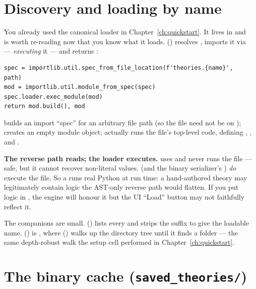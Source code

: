 \section{Discovery and loading by name}

You already used the canonical loader in Chapter~\ref{ch:quickstart}. It lives in
 and is worth re-reading now that you know what it
loads.  ()
resolves , imports it via 
--- \emph{executing} it --- and returns :

\begin{lstlisting}
spec = importlib.util.spec_from_file_location(f'theories.{name}', path)
mod = importlib.util.module_from_spec(spec)
spec.loader.exec_module(mod)
return mod.build(), mod
\end{lstlisting}

 builds an import ``spec'' for an arbitrary file
path (so the file need not be on ); 
creates an empty module object;  actually runs the file's
top-level code, defining , , and
.

\begin{gotcha}
\textbf{The reverse path reads; the loader executes.} 
uses  and never runs the file --- safe, but it cannot recover
non-literal values.  (and the binary serializer's
) \emph{do} execute the file. So a  runs real
Python at run time: a hand-authored theory may legitimately contain logic the
AST-only reverse path would flatten. If you put logic in , the
engine will honour it but the UI ``Load'' button may not faithfully reflect it.
\end{gotcha}

The companions are small.  ()
lists every  and strips the suffix to give the loadable
name.  () is , where
 () walks up the directory tree until it finds a
 folder --- the same depth-robust walk the setup cell performed in
Chapter~\ref{ch:quickstart}.

\section{The binary cache (\texttt{saved\_theories/})}

